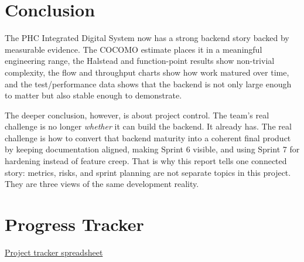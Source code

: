 \documentclass[11pt,a4paper]{article}
\begin{document}
\section{Conclusion}
The PHC Integrated Digital System now has a strong backend story backed by measurable evidence. The COCOMO estimate places it in a meaningful engineering range, the Halstead and function-point results show non-trivial complexity, the flow and throughput charts show how work matured over time, and the test/performance data shows that the backend is not only large enough to matter but also stable enough to demonstrate.

The deeper conclusion, however, is about project control. The team’s real challenge is no longer \emph{whether} it can build the backend. It already has. The real challenge is how to convert that backend maturity into a coherent final product by keeping documentation aligned, making Sprint 6 visible, and using Sprint 7 for hardening instead of feature creep. That is why this report tells one connected story: metrics, risks, and sprint planning are not separate topics in this project. They are three views of the same development reality.

\section*{Progress Tracker}
\href{https://docs.google.com/spreadsheets/d/1xLa2L8eWv8gfrIwPXrnImF8uManlRlRwRp3ksSOVI9E/edit?usp=sharing}{Project tracker spreadsheet}
\end{document}
